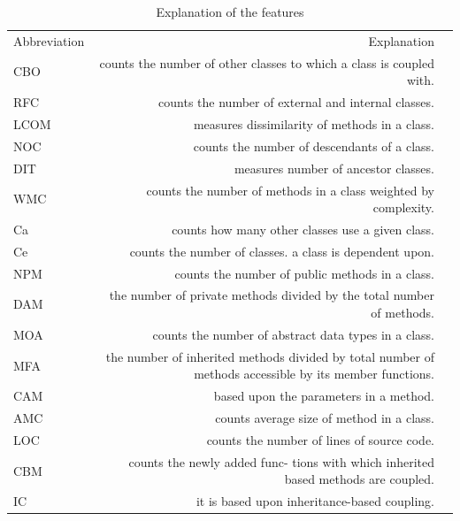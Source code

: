 \begin{table}[!htp]\centering
\caption{Explanation of the features}\label{tab: }
\scriptsize
\begin{tabular}{lrr}\toprule
Abbreviation &Explanation \\
CBO &counts the number of other classes to which a class is coupled with. \\\midrule
RFC &counts the number of external and internal classes. \\
LCOM &measures dissimilarity of methods in a class. \\
NOC &counts the number of descendants of a class. \\
DIT &measures number of ancestor classes. \\
WMC &counts the number of methods in a class weighted by complexity. \\
Ca &counts how many other classes use a given class. \\
Ce &counts the number of classes. a class is dependent upon. \\
NPM &counts the number of public methods in a class. \\
DAM &the number of private methods divided by the total number of methods. \\
MOA &counts the number of abstract data types in a class. \\
MFA &the number of inherited methods divided by total number of methods accessible by its member functions. \\
CAM &based upon the parameters in a method. \\
AMC &counts average size of method in a class. \\
LOC &counts the number of lines of source code. \\
CBM &counts the newly added func- tions with which inherited based methods are coupled. \\
IC &it is based upon inheritance-based coupling. \\
\bottomrule
\end{tabular}
\end{table}

